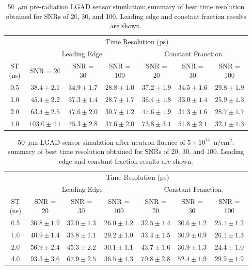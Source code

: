 \documentclass[preprint,1p]{elsarticle}
\begin{document}
\begin{table}\label{tab:shaping_time_prerad}
    \begin{tabular}{c|ccc|ccc}
    \multicolumn{1}{c}{}& \multicolumn{6}{c}{Time Resolution (ps)} \\
    \multicolumn{1}{c}{}&\multicolumn{3}{c}{Leading Edge} & \multicolumn{3}{c}{Constant Franction}\\ \hline
    ST (ns) & SNR = 20   & SNR = 30      & SNR = 100     & SNR = 20      & SNR = 30      & SNR = 100 \\
    0.5 & $38.4 \pm 2.1$  & $34.9 \pm 1.7$  & $28.8 \pm 1.0$  & $37.2 \pm 1.9$  & $34.5 \pm 1.6$  & $29.8 \pm 1.9$ \\
    1.0 & $45.4 \pm 2.2$  & $37.3 \pm 1.4$  & $28.7 \pm 1.7$  & $36.4 \pm 1.8$  & $33.0 \pm 1.4$  & $25.9 \pm 1.3$ \\
    2.0 & $63.4 \pm 2.5$  & $47.6 \pm 2.0$  & $30.7 \pm 1.2$  & $47.6 \pm 1.9$  & $34.3 \pm 1.6$  & $28.7 \pm 1.7$ \\
    4.0 & $103.0 \pm 4.1$  & $75.3 \pm 2.8$  & $37.6 \pm 2.0$  & $73.8 \pm 3.1$  & $54.8 \pm 2.1$  & $32.1 \pm 1.3$ \\
    \end{tabular}
    \caption{50~$\mu$m pre-radiation LGAD sensor simulation: summary of best time resolution obtained for SNRs
    of 20, 30, and 100. Leading edge and constant fraction results are shown.}
 \end{table}

 \begin{table}\label{tab:shaping_time_5e14}
     \begin{tabular}{c|ccc|ccc}
     \multicolumn{1}{c}{}& \multicolumn{6}{c}{Time Resolution (ps)} \\
     \multicolumn{1}{c}{}&\multicolumn{3}{c}{Leading Edge} & \multicolumn{3}{c}{Constant Franction}\\ \hline
     ST (ns) & SNR = 20   & SNR = 30      & SNR = 100     & SNR = 20      & SNR = 30      & SNR = 100 \\
     0.5 & $36.8 \pm 1.9$  & $32.0 \pm 1.3$  & $26.0 \pm 1.2$  & $32.5 \pm 1.4$  & $30.6 \pm 1.2$  & $25.1 \pm 1.2$ \\
     1.0 & $40.9 \pm 1.4$  & $33.8 \pm 1.1$  & $29.2 \pm 1.0$  & $33.4 \pm 1.5$  & $30.9 \pm 0.9$  & $26.1 \pm 1.3$ \\
     2.0 & $56.9 \pm 2.4$  & $45.3 \pm 2.2$  & $30.1 \pm 1.1$  & $43.7 \pm 1.6$  & $36.9 \pm 1.3$  & $24.4 \pm 1.0$ \\
     4.0 & $93.3 \pm 3.6$  & $67.9 \pm 2.5$  & $36.5 \pm 1.3$  & $70.8 \pm 2.8$  & $52.4 \pm 1.9$  & $29.9 \pm 1.9$ \\
     \end{tabular}
     \caption{50~$\mu$m LGAD sensor simulation after neutron fluence of
      $5\times 10^{14}$~n/cm$^2$: summary of best time resolution obtained for SNRs
     of 20, 30, and 100. Leading edge and constant fraction results are shown.}
  \end{table}
\end{document}

